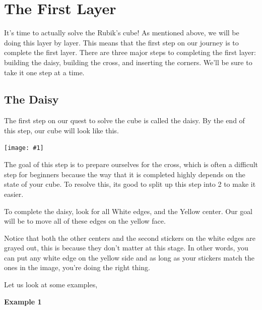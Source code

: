 \documentclass[12pt,letterpaper]{article}
\newcommand{\pic}[1]{
  \begin{center}
	  \texttt{[image: \#1]}
  \end{center}
}
\begin{document}



\newpage

\section{The First Layer}

It's time to actually solve the Rubik's cube! As mentioned above, we will be
doing this layer by layer. This means that the first step on our journey is to
complete the first layer. There are three major steps to completing the first
layer: building the daisy, building the cross, and inserting the corners. We'll
be sure to take it one step at a time.

\subsection{The Daisy}

The first step on our quest to solve the cube is called the daisy. By the end of
this step, our cube will look like this.

\pic{daisy/daisy}

The goal of this step is to prepare ourselves for the cross, which is often a
difficult step for beginners because the way that it is completed highly depends
on the state of your cube. To resolve this, its good to split up this step into
2 to make it easier.

To complete the daisy, look for all {\sc White} edges, and the {\sc Yellow}
center. Our goal will be to move all of these edges on the yellow face.

Notice that both the other centers and the second stickers on the white edges
are grayed out, this is because they don't matter at this stage. In other words,
you can put any white edge on the yellow side and as long as your stickers match
the ones in the image, you're doing the right thing.

Let us look at some examples,

{\bf Example 1}
\end{document}
